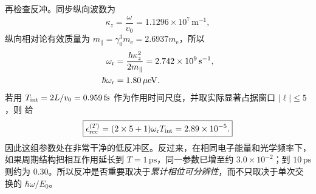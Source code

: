 \begin{exbox}
再检查反冲。同步纵向波数为
\begin{equation*}
 \kappa_z=\frac{\omega}{v_0}=1.1296\times10^7\,\mathrm{m^{-1}},
\end{equation*}
纵向相对论有效质量为 $m_\parallel=\gamma_0^3m_{\mathrm e}=2.6937m_{\mathrm e}$，所以
\begin{align*}
 \omega_{\rm r}
 &=\frac{\hbar\kappa_z^2}{2m_\parallel}
 =2.742\times10^9\,\mathrm{s^{-1}},\\
 \hbar\omega_{\rm r}
 &=1.80\,\mu\mathrm{eV}.
\end{align*}
若用 $T_{\rm int}=2L/v_0=0.959\,\mathrm{fs}$ 作为作用时间尺度，并取实际显著占据窗口 $|\ell|\le5$，则 给
\begin{equation}
 \boxed{
 \epsilon_{\rm rec}^{(T)}
 =(2\times5+1)\omega_{\rm r}T_{\rm int}
 =2.89\times10^{-5}.}
 \label{eq:pinem-gaussian-recoil-number-dp65}
\end{equation}
因此这组参数处在非常干净的低反冲区。反过来，在相同电子能量和光学频率下，如果周期结构把相互作用延长到 $T=1\,\mathrm{ps}$，同一参数已增至约 $3.0\times10^{-2}$；到 $10\,\mathrm{ps}$ 则约为 $0.30$。所以反冲是否重要取决于\emph{累计相位可分辨性}，而不只取决于单次交换的 $\hbar\omega/E_0$。
\end{exbox}
